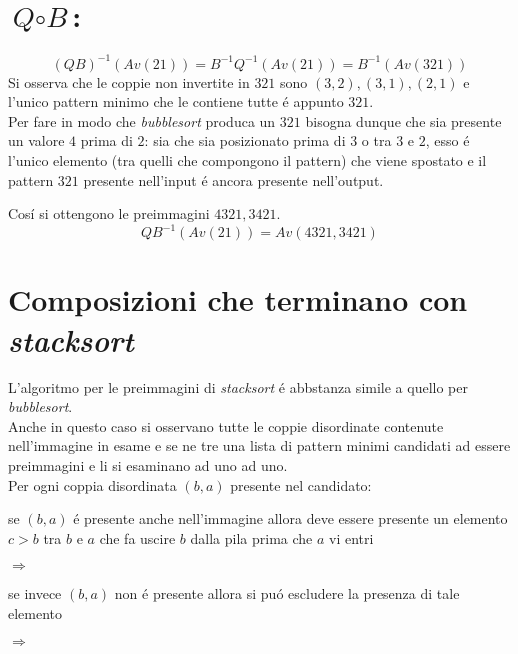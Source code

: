 \section*{$\textit{Q}\circ\textit{B}$:}$$(QB)^{-1}(Av(21))=B^{-1}Q^{-1}(Av(21))=B^{-1}(Av(321))$$Si osserva che le coppie non invertite in $321$ sono $(3,2),(3,1),(2,1)$ e l'unico pattern minimo che le contiene tutte \'e appunto $321$.\\Per fare in modo che \textit{bubblesort} produca un $321$ bisogna dunque che sia presente un valore $4$ prima di $2$: sia che sia posizionato prima di $3$ o tra $3$ e $2$, esso \'e l'unico elemento (tra quelli che compongono il pattern) che viene spostato e il pattern $321$ presente nell'input \'e ancora presente nell'output.\\
\begin{center}
\end{center}
Cos\'i si ottengono le preimmagini $4321,3421$.$$QB^{-1}(Av(21))=Av(4321,3421)$$
\section*{Composizioni che terminano con \textit{stacksort}}
L'algoritmo per le preimmagini di \textit{stacksort} \'e abbstanza simile a quello per \textit{bubblesort}.\\
Anche in questo caso si osservano tutte le coppie disordinate contenute nell'immagine in esame e se ne tre una lista di pattern minimi candidati ad essere preimmagini e li si esaminano ad uno ad uno.\\
Per ogni coppia disordinata $(b,a)$ presente nel candidato: 
\begin{description}
\item se $(b,a)$ \'e presente anche nell'immagine allora deve essere presente un elemento $c>b$ tra $b$ e $a$ che fa uscire $b$ dalla pila prima che $a$ vi entri
\begin{center}
 $\Longrightarrow$ 
\end{center}
\item se invece $(b,a)$ non \'e presente allora si pu\'o escludere la presenza di tale elemento
\begin{center}
 $\Longrightarrow$ 
\end{center}
\end{description}

